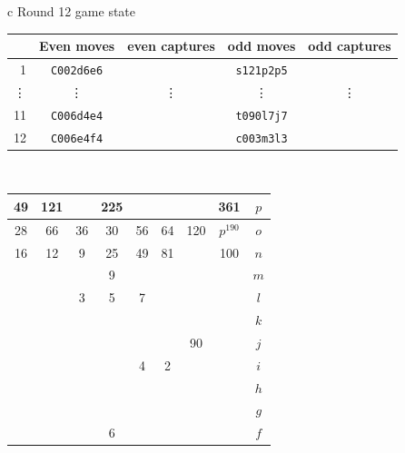 \documentclass[12pt]{article}
\begin{document}
{\small{
\begin{tabular}{c}
Round 12 game state \\
\begin{tabular}{r|cc|cc}
 & Even moves & even captures    & odd moves & odd captures \\    \hline 
1   &  {\tt C002d6e6} & \quad &  {\tt s121p2p5} & \quad \\
\vdots &  \vdots    & \vdots  & \vdots    & \vdots \\  
11  &  {\tt C006d4e4} & \quad &  {\tt t090l7j7} & \quad \\
12  &  {\tt C006e4f4} & \quad &  {\tt c003m3l3} & \quad \\
\end{tabular}
\\
\begin{tabular}{|c|c|c|c|c|c|c|c||c} \hline
\squadfill{\,}49 & \squadfill{\,}121 & \quad & \squadfill{\,}225 & \quad & \quad & \quad & \squadfill{\,}361 & $p$ \\ \hline
\squadfill{\,}28 & \squadfill{\,}66 & \trianglepafill{\,}36 & \trianglepafill{\,}30 & \trianglepafill{\,}56 & \trianglepafill{\,}64 & \squadfill{\,}120 & \rhombusfill{\,}$p^{190}$ & $o$ \\ \hline
\trianglepafill{\,}16 & \trianglepafill{\,}12 & \circletfill{\,}9 & \circletfill{\,}25 & \circletfill{\,}49 & \circletfill{\,}81 & \quad & \trianglepafill{\,}100 & $n$ \\ \hline
\quad & \quad & \quad & \circletfill{\,}9 & \quad & \quad & \quad & \quad & $m$ \\ \hline
\quad & \quad & \circletfill{\,}3 & \circletfill{\,}5 & \circletfill{\,}7 & \quad & \quad & \quad & $l$ \\ \hline
\quad & \quad & \quad & \quad & \quad & \quad & \quad & \quad & $k$ \\ \hline
\quad & \quad & \quad & \quad & \quad & \quad & \trianglepafill{\,}90 & \quad & $j$ \\ \hline
\quad & \quad & \quad & \quad & \circlet{\,}4 & \circlet{\,}2 & \quad & \quad & $i$ \\ \hline
\quad & \quad & \quad & \quad & \quad & \quad & \quad & \quad & $h$ \\ \hline
\quad & \quad & \quad & \quad & \quad & \quad & \quad & \quad & $g$ \\ \hline
\quad & \quad & \quad & \circlet{\,}6 & \quad & \quad & \quad & \quad & $f$ \\ \hline

\end{tabular}
\end{tabular}}}
\end{document}
